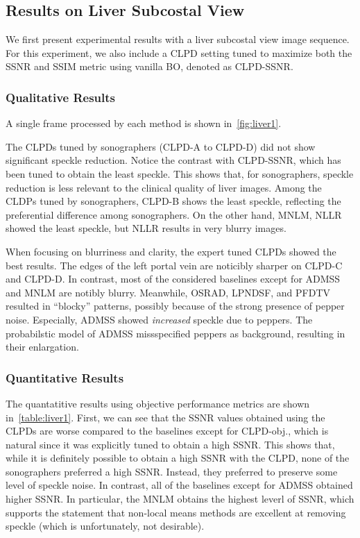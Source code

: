 \subsection{Results on Liver Subcostal View}
We first present experimental results with a liver subcostal view image sequence.
For this experiment, we also include a CLPD setting tuned to maximize both the SSNR and SSIM metric using vanilla BO, denoted as CLPD-SSNR.

\subsubsection{Qualitative Results}
A single frame processed by each method is shown in~\cref{fig:liver1}.

The CLPDs tuned by sonographers (CLPD-A to CLPD-D) did not show significant speckle reduction.
Notice the contrast with CLPD-SSNR, which has been tuned to obtain the least speckle.
This shows that, for sonographers, speckle reduction is less relevant to the clinical quality of liver images.
Among the CLDPs tuned by sonographers, CLPD-B shows the least speckle, reflecting the preferential difference among sonographers.
On the other hand, MNLM, NLLR showed the least speckle, but NLLR results in very blurry images.

When focusing on blurriness and clarity, the expert tuned CLPDs showed the best results.
The edges of the left portal vein are noticibly sharper on CLPD-C and CLPD-D.
In contrast, most of the considered baselines except for ADMSS and MNLM are notibly blurry.
Meanwhile, OSRAD, LPNDSF, and PFDTV resulted in ``blocky'' patterns, possibly because of the strong presence of pepper noise. 
Especially, ADMSS showed \textit{increased} speckle due to peppers.
The probabilstic model of ADMSS missspecified peppers as background, resulting in their enlargation.


%
\subsubsection{Quantitative Results}
The quantatitive results using objective performance metrics are shown in~\cref{table:liver1}.
First, we can see that the SSNR values obtained using the CLPDs are worse compared to the baselines except for CLPD-obj., which is natural since it was explicitly tuned to obtain a high SSNR.
This shows that, while it is definitely possible to obtain a high SSNR with the CLPD, none of the sonographers preferred a high SSNR.
Instead, they preferred to preserve some level of speckle noise.
In contrast, all of the baselines except for ADMSS obtained higher SSNR.
In particular, the MNLM obtains the highest leverl of SSNR, which supports the statement that non-local means methods are excellent at removing speckle (which is unfortunately, not desirable).

